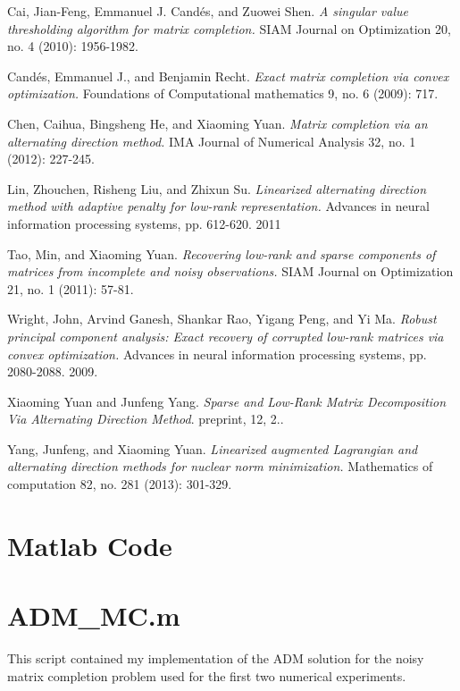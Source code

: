 \documentclass{article}
\begin{document}
\pagebreak
\newpage
\begin{thebibliography}{9}

Cai, Jian-Feng, Emmanuel J. Cand\'es, and Zuowei Shen.
\textit{A singular value thresholding algorithm for matrix completion.}
SIAM Journal on Optimization 20, no. 4 (2010): 1956-1982.

Cand\'es, Emmanuel J., and Benjamin Recht.
\textit{Exact matrix completion via convex optimization.}
Foundations of Computational mathematics 9, no. 6 (2009): 717.


Chen, Caihua, Bingsheng He, and Xiaoming Yuan.
\textit{Matrix completion via an alternating direction method.}
IMA Journal of Numerical Analysis 32, no. 1 (2012): 227-245.

Lin, Zhouchen, Risheng Liu, and Zhixun Su.
\textit{Linearized alternating direction method with adaptive penalty for low-rank representation.}
Advances in neural information processing systems, pp. 612-620. 2011

Tao, Min, and Xiaoming Yuan.
\textit{Recovering low-rank and sparse components of matrices from incomplete and noisy observations.}
SIAM Journal on Optimization 21, no. 1 (2011): 57-81.

Wright, John, Arvind Ganesh, Shankar Rao, Yigang Peng, and Yi Ma.
\textit{Robust principal component analysis: Exact recovery of corrupted low-rank matrices via convex optimization.}
Advances in neural information processing systems, pp. 2080-2088. 2009.

Xiaoming Yuan and Junfeng Yang. 
\textit{Sparse and Low-Rank Matrix Decomposition Via Alternating Direction Method}. 
 preprint, 12, 2..
 
Yang, Junfeng, and Xiaoming Yuan.
\textit{Linearized augmented Lagrangian and alternating direction methods for nuclear norm minimization.}
Mathematics of computation 82, no. 281 (2013): 301-329.

\end{thebibliography}
\pagebreak
\newpage
\section{Matlab Code}
\section*{ADM\_MC.m}
This script contained my implementation of the ADM solution for the noisy matrix completion problem used for the first two numerical experiments.

\vspace{10mm}
\end{document}
